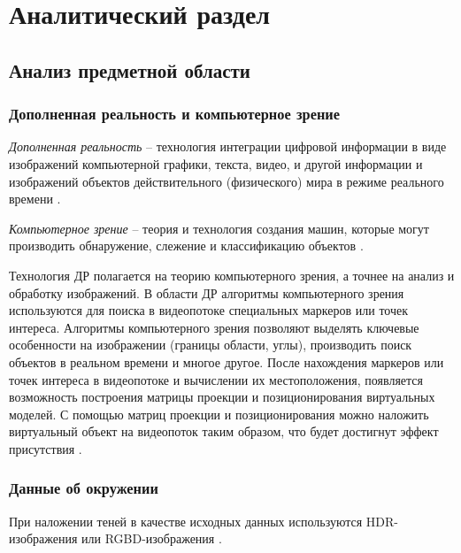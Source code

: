 \chapter{Аналитический раздел}

\section{Анализ предметной области}

\subsection*{Дополненная реальность и компьютерное зрение}

\textit{Дополненная реальность} -- технология интеграции цифровой информации в виде изображений компьютерной графики, текста, видео, и другой информации и изображений объектов действительного (физического) мира в режиме реального времени \cite{tech-ar}.

\textit{Компьютерное зрение} -- теория и технология создания машин, которые могут производить обнаружение, слежение и классификацию объектов \cite{comp_vision}. 

Технология ДР полагается на теорию компьютерного зрения, а точнее на анализ и обработку изображений. В области
ДР алгоритмы компьютерного зрения используются для поиска в видеопотоке специальных маркеров или точек интереса. Алгоритмы компьютерного зрения позволяют выделять ключевые особенности на изображении (границы области, углы), производить поиск объектов в реальном времени и многое другое. После нахождения маркеров или точек интереса в видеопотоке и вычислении их местоположения, появляется возможность построения матрицы проекции и позиционирования виртуальных моделей. С помощью матриц проекции и позиционирования можно наложить виртуальный объект на видеопоток таким образом, что будет достигнут эффект присутствия \cite{tech-ar}.

\subsection*{Данные об окружении}

При наложении теней в качестве исходных данных используются HDR-изображения или RGBD-изображения \cite{debevec2008rendering, sns_tras}.

